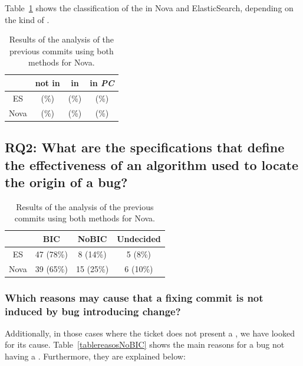 \documentclass[a4paper, 12pt]{book}
\begin{document}
Table~\ref{tableFFC} shows the classification of the \FFC in Nova and ElasticSearch, depending on the kind of \FFC. 
\begin{table}[!t]
	\renewcommand{\arraystretch}{1.3}
	\caption{Results of the analysis of the previous commits using both methods for Nova.}
	\label{tableFFC}
	\centering
	\begin{tabular}{|c||c||c||c| }
		\hline
  		&  \FFC not in \ACS & \FFC in \ACS & \FFC in \emph{PC} \\
		\hline
		ES & (\%) &  (\%) &  (\%)\\
		Nova & (\%) &  (\%) & (\%)\\
		\hline
	\end{tabular}
\end{table}

\vspace{0.2cm}
\vspace{0.1cm}

\subsection{ RQ2: What are the specifications that define the effectiveness of an algorithm used to locate the origin of a bug? }

\begin{table}[!t]
\renewcommand{\arraystretch}{1.3}
\caption{Results of the analysis of the previous commits using both methods for Nova.}
\label{tableIV}
\centering
\begin{tabular}{|c||c||c||c| }
\hline
  &  BIC & NoBIC & Undecided \\
\hline
ES & 47 (78\%) & 8 (14\%) & 5 (8\%)\\
Nova & 39 (65\%) & 15 (25\%) & 6 (10\%) \\
\hline
\end{tabular}
\end{table}

\subsubsection{Which reasons may cause that a fixing commit is not induced by bug introducing change?}

Additionally, in those cases where the ticket does not present a \BIC, we have looked for its cause. Table~\ref{tablereasosNoBIC} shows the main reasons for a bug not having a \BIC. Furthermore, they are explained below:
\end{document}
